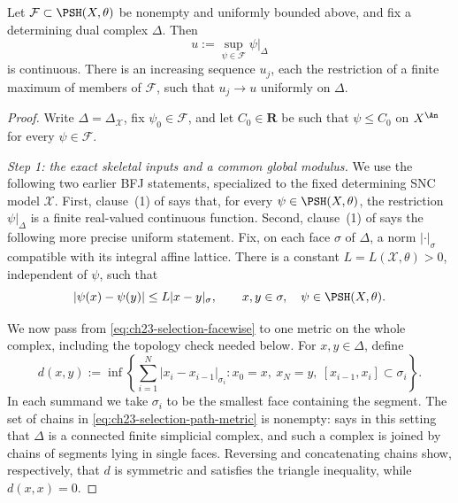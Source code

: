 \begin{proposition}\label{prop:ch23-fixed-skeleton-selection}
Let \(\mathcal F\subset\PSH(X,\theta)\) be nonempty and uniformly bounded
above, and fix a determining dual complex \(\Delta\).  Then
\begin{equation}\label{eq:ch23-fixed-skeleton-sup}
                    u:=\sup_{\psi\in\mathcal F}\psi|_\Delta
\end{equation}
is continuous.  There is an increasing sequence \(u_j\), each the
restriction of a finite maximum of members of \(\mathcal F\), such that
\(u_j\to u\) uniformly on \(\Delta\).
\end{proposition}

\begin{proof}
Write \(\Delta=\Delta_{\mathcal X}\), fix \(\psi_0\in\mathcal F\), and let
\(C_0\in\mathbf R\) be such that \(\psi\leq C_0\) on \(X^{\An}\) for every
\(\psi\in\mathcal F\).

\emph{Step 1: the exact skeletal inputs and a common global modulus.}
We use the following two earlier BFJ statements, specialized to the fixed
determining SNC model \(\mathcal X\).  First, clause~(1) of
 says that, for every
\(\psi\in\PSH(X,\theta)\), the restriction \(\psi|_\Delta\) is a finite
real-valued continuous function.  Second, clause~(1) of
 says the following more precise
uniform statement.  Fix, on each face \(\sigma\) of \(\Delta\), a norm
\(|\cdot|_\sigma\) compatible with its integral affine lattice.  There is a
constant \(L=L(\mathcal X,\theta)>0\), independent of \(\psi\), such that
\begin{equation}\label{eq:ch23-selection-facewise}
 |\psi(x)-\psi(y)|\leq L|x-y|_\sigma,
 \qquad x,y\in\sigma,
 \quad \psi\in\PSH(X,\theta).
\end{equation}

We now pass from \eqref{eq:ch23-selection-facewise} to one metric on the
whole complex, including the topology check needed below.  For
\(x,y\in\Delta\), define
\begin{equation}\label{eq:ch23-selection-path-metric}
 d(x,y):=\inf\left\{
   \sum_{i=1}^{N}|x_i-x_{i-1}|_{\sigma_i}:
   x_0=x,\ x_N=y,\ [x_{i-1},x_i]\subset\sigma_i
 \right\}.
\end{equation}
In each summand we take \(\sigma_i\) to be the smallest face containing the
segment.  The set of chains in \eqref{eq:ch23-selection-path-metric} is
nonempty:  says in this setting that
\(\Delta\) is a connected finite simplicial complex, and such a complex is
joined by chains of segments lying in single faces.  Reversing and
concatenating chains show, respectively, that \(d\) is symmetric and
satisfies the triangle inequality, while \(d(x,x)=0\).


\end{proof}
